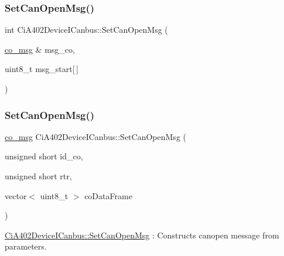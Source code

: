 \mbox{\label{classCiA402DeviceICanbus_af09467b107e73f67804942db1597d983}} 
\subsubsection{\texorpdfstring{Set\+Can\+Open\+Msg()}{SetCanOpenMsg()}\hspace{0.1cm}{\footnotesize\ttfamily [2/3]}}
{\footnotesize\ttfamily int Ci\+A402\+Device\+I\+Canbus\+::\+Set\+Can\+Open\+Msg (\begin{DoxyParamCaption}\item[{\hyperlink{structco__msg}{co\+\_\+msg} \&}]{msg\+\_\+co,  }\item[{uint8\+\_\+t}]{msg\+\_\+start\mbox{[}$\,$\mbox{]} }\end{DoxyParamCaption})}

\mbox{\label{classCiA402DeviceICanbus_ab861fc4d62c917bdb1c06b886c8ed45a}} 
\subsubsection{\texorpdfstring{Set\+Can\+Open\+Msg()}{SetCanOpenMsg()}\hspace{0.1cm}{\footnotesize\ttfamily [3/3]}}
{\footnotesize\ttfamily \hyperlink{structco__msg}{co\+\_\+msg} Ci\+A402\+Device\+I\+Canbus\+::\+Set\+Can\+Open\+Msg (\begin{DoxyParamCaption}\item[{unsigned short}]{id\+\_\+co,  }\item[{unsigned short}]{rtr,  }\item[{vector$<$ uint8\+\_\+t $>$}]{co\+Data\+Frame }\end{DoxyParamCaption})}



\hyperlink{classCiA402DeviceICanbus_aa439b9175f5879282058a3f4c2edb45d}{Ci\+A402\+Device\+I\+Canbus\+::\+Set\+Can\+Open\+Msg} \+: Constructs canopen message from parameters. 


